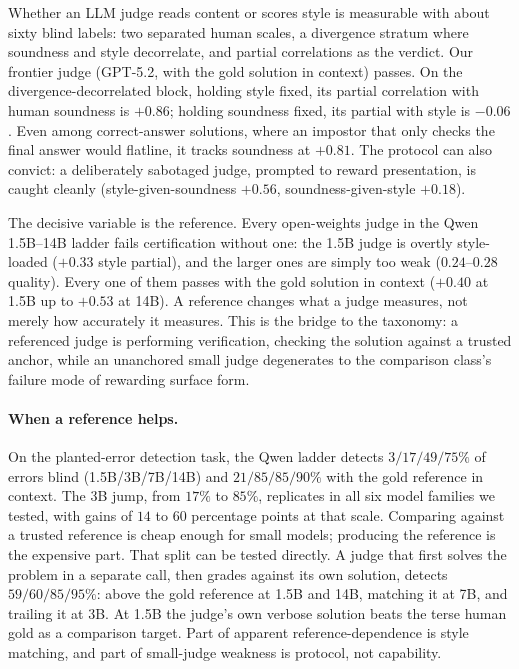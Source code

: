 \documentclass[11pt]{article}
\begin{document}
Whether an LLM judge reads content or scores style is measurable with about sixty blind labels: two separated human scales, a divergence stratum where soundness and style decorrelate, and partial correlations as the verdict.
Our frontier judge (GPT-5.2, with the gold solution in context) passes.
On the divergence-decorrelated block, holding style fixed, its partial correlation with human soundness is $+0.86$; holding soundness fixed, its partial with style is $-0.06$.
Even among correct-answer solutions, where an impostor that only checks the final answer would flatline, it tracks soundness at $+0.81$.
The protocol can also convict: a deliberately sabotaged judge, prompted to reward presentation, is caught cleanly (style-given-soundness $+0.56$, soundness-given-style $+0.18$).

The decisive variable is the reference.
Every open-weights judge in the Qwen 1.5B--14B ladder fails certification without one: the 1.5B judge is overtly style-loaded ($+0.33$ style partial), and the larger ones are simply too weak ($0.24$--$0.28$ quality).
Every one of them passes with the gold solution in context ($+0.40$ at 1.5B up to $+0.53$ at 14B).
A reference changes what a judge measures, not merely how accurately it measures.
This is the bridge to the taxonomy: a referenced judge is performing verification, checking the solution against a trusted anchor, while an unanchored small judge degenerates to the comparison class's failure mode of rewarding surface form.

\paragraph{When a reference helps.}
On the planted-error detection task, the Qwen ladder detects $3/17/49/75\%$ of errors blind (1.5B/3B/7B/14B) and $21/85/85/90\%$ with the gold reference in context.
The 3B jump, from $17\%$ to $85\%$, replicates in all six model families we tested, with gains of $14$ to $60$ percentage points at that scale.
Comparing against a trusted reference is cheap enough for small models; producing the reference is the expensive part.
That split can be tested directly.
A judge that first solves the problem in a separate call, then grades against its own solution, detects $59/60/85/95\%$: above the gold reference at 1.5B and 14B, matching it at 7B, and trailing it at 3B.
At 1.5B the judge's own verbose solution beats the terse human gold as a comparison target.
Part of apparent reference-dependence is style matching, and part of small-judge weakness is protocol, not capability.
\end{document}

